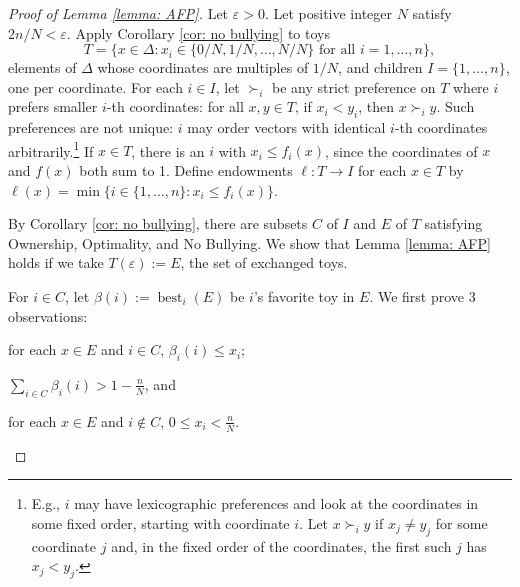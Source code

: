 \documentclass[english, 11pt]{article}
\theoremstyle{plain} %
\theoremstyle{definition}
\DeclareMathOperator{\best}{best}
\begin{document}
\begin{proof}[Proof of Lemma \ref{lemma: AFP}]
Let $\varepsilon > 0$. Let positive integer $N$ satisfy $2n/N < \varepsilon$. Apply Corollary \ref{cor: no bullying} to toys
\[
T = \{x \in \Delta: x_i \in \{0/N, 1/N, \ldots, N/N\} \text{ for all } i = 1, \ldots, n\},
\]
elements of $\Delta$ whose coordinates are multiples of $1/N$, and children $I = \{1, \ldots, n\}$, one per coordinate. For each $i \in I$, let $\succ_i$ be any strict preference on $T$ where $i$ prefers smaller $i$-th coordinates: for all $x, y \in T$, if $x_i < y_i$, then $x \succ_i y$. Such preferences are not unique: $i$ may order vectors with identical $i$-th coordinates arbitrarily.\footnote{E.g., $i$ may have lexicographic preferences and look at the coordinates in some fixed order, starting with coordinate $i$. Let $x \succ_i y$ if $x_j \neq y_j$ for some coordinate $j$ and, in the fixed order of the coordinates, the first such $j$ has $x_j < y_j$.}
If $x \in T$, there is an $i$ with $x_i \leq f_i(x)$, since the coordinates of $x$ and $f(x)$ both sum to 1. Define endowments $\ell: T \to I$ for each $x \in T$ by $\ell(x) = \min \{i \in \{1, \ldots, n\}: x_i \leq f_i(x)\}$.

By Corollary \ref{cor: no bullying}, there are subsets $C$ of $I$ and $E$ of $T$ satisfying Ownership, Optimality, and No Bullying. We show that Lemma \ref{lemma: AFP} holds if we take $T(\varepsilon) := E$, the set of exchanged toys.

For $i \in C$, let $\beta(i) := \best_i(E)$ be $i$'s favorite toy in $E$. We first prove 3 observations:
\begin{enumerate*}[label=(O\arabic*)]
\item\label{O1} for each $x \in E$ and $i \in C$, $\beta_i(i) \leq x_i$;
\item\label{O2} $\sum_{i \in C} \beta_i(i) > 1 - \frac{n}{N}$, and
\item\label{O3} for each $x \in E$ and $i \notin C$, $0 \leq x_i < \frac{n}{N}$.
\end{enumerate*}


\end{proof}
\end{document}
